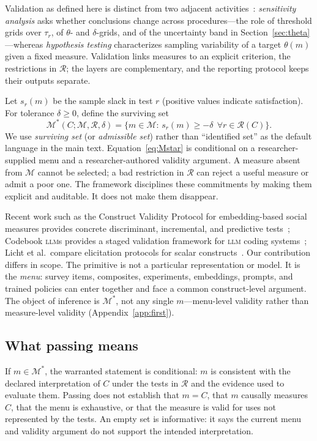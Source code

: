 \documentclass[10pt,letterpaper]{article}
\newcommand{\LLM}{\textsc{llm}}
\newcommand{\M}{\ensuremath{\mathcal{M}}}
\newcommand{\Rset}{\mathcal{R}}
\begin{document}
Validation as defined here is distinct from two adjacent activities~\cite{dellrambachan2026}: \emph{sensitivity analysis} asks whether conclusions change across procedures---the role of threshold grids over $\tau_r$, of $\theta$- and $\delta$-grids, and of the uncertainty band in Section~\ref{sec:theta}---whereas \emph{hypothesis testing} characterizes sampling variability of a target $\theta(m)$ given a fixed measure.
Validation links measures to an explicit criterion, the restrictions in $\Rset$; the layers are complementary, and the reporting protocol keeps their outputs separate.

Let $s_r(m)$ be the sample slack in test $r$ (positive values indicate satisfaction).
For tolerance $\delta\ge 0$, define the surviving set
\begin{equation}
\M^*(C;\M,\Rset,\delta)
=\bigl\{m\in\M:\, s_r(m)\ge -\delta\ \ \forall r\in\Rset(C)\bigr\}.
\label{eq:Mstar}
\end{equation}
We use \emph{surviving set} (or \emph{admissible set}) rather than ``identified set'' as the default language in the main text.
Equation~\eqref{eq:Mstar} is conditional on a researcher-supplied menu and a researcher-authored validity argument.
A measure absent from $\M$ cannot be selected; a bad restriction in $\Rset$ can reject a useful measure or admit a poor one.
The framework disciplines these commitments by making them explicit and auditable.
It does not make them disappear.

Recent work such as the Construct Validity Protocol for embedding-based social measures provides concrete discriminant, incremental, and predictive tests~\cite{proxy2026}; Codebook \LLM{}s provides a staged validation framework for \LLM{} coding systems~\cite{halterman2024}; Licht et al.\ compare elicitation protocols for scalar constructs~\cite{licht2025}.
Our contribution differs in scope.
The primitive is not a particular representation or model.
It is the \emph{menu}: survey items, composites, experiments, embeddings, prompts, and trained policies can enter together and face a common construct-level argument.
The object of inference is $\M^*$, not any single $m$---menu-level validity rather than measure-level validity (Appendix~\ref{app:first}).

\subsection{What passing means}
If $m\in\M^*$, the warranted statement is conditional: $m$ is consistent with the declared interpretation of $C$ under the tests in $\Rset$ and the evidence used to evaluate them.
Passing does not establish that $m=C$, that $m$ causally measures $C$, that the menu is exhaustive, or that the measure is valid for uses not represented by the tests.
An empty set is informative: it says the current menu and validity argument do not support the intended interpretation.
\end{document}
